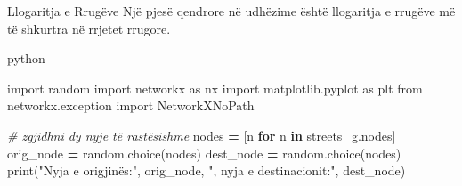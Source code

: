 \documentclass[
  ignorenonframetext,
]{beamer}
\newenvironment{Shaded}{\begin{snugshade}}{\end{snugshade}}
\newcommand{\BuiltInTok}[1]{#1}
\newcommand{\CommentTok}[1]{\textcolor[rgb]{0.56,0.35,0.01}{\textit{#1}}}
\newcommand{\ControlFlowTok}[1]{\textcolor[rgb]{0.13,0.29,0.53}{\textbf{#1}}}
\newcommand{\ImportTok}[1]{#1}
\newcommand{\KeywordTok}[1]{\textcolor[rgb]{0.13,0.29,0.53}{\textbf{#1}}}
\newcommand{\NormalTok}[1]{#1}
\newcommand{\OperatorTok}[1]{\textcolor[rgb]{0.81,0.36,0.00}{\textbf{#1}}}
\newcommand{\StringTok}[1]{\textcolor[rgb]{0.31,0.60,0.02}{#1}}
\begin{document}
\begin{frame}[fragile]{Llogaritja e Rrugëve}
\protect\hypertarget{llogaritja-e-rruguxebve}{}
Një pjesë qendrore në udhëzime është llogaritja e rrugëve më të shkurtra
në rrjetet rrugore.

python

\begin{Shaded}
\begin{Highlighting}[]
\ImportTok{import}\NormalTok{ random}
\ImportTok{import}\NormalTok{ networkx }\ImportTok{as}\NormalTok{ nx}
\ImportTok{import}\NormalTok{ matplotlib.pyplot }\ImportTok{as}\NormalTok{ plt}
\ImportTok{from}\NormalTok{ networkx.exception }\ImportTok{import}\NormalTok{ NetworkXNoPath}

\CommentTok{\# zgjidhni dy nyje të rastësishme}
\NormalTok{nodes }\OperatorTok{=}\NormalTok{ [n }\ControlFlowTok{for}\NormalTok{ n }\KeywordTok{in}\NormalTok{ streets\_g.nodes]}
\NormalTok{orig\_node }\OperatorTok{=}\NormalTok{ random.choice(nodes)}
\NormalTok{dest\_node }\OperatorTok{=}\NormalTok{ random.choice(nodes)}
\BuiltInTok{print}\NormalTok{(}\StringTok{"Nyja e origjinës:"}\NormalTok{, orig\_node, }\StringTok{", nyja e destinacionit:"}\NormalTok{, dest\_node)}
\end{Highlighting}
\end{Shaded}
\end{frame}
\end{document}
